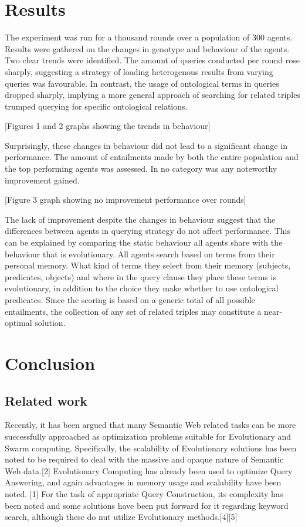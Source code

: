 \documentclass[thesis,12pt]{article}
\begin{document}
\section{Results}
The experiment was run for a thousand rounds over a population of 300 agents. Results were gathered on the changes in genotype and behaviour of the agents. Two clear trends were identified. The amount of queries conducted per round rose sharply, suggesting a strategy of loading heterogenous results from varying queries was favourable. In contrast, the usage of ontological terms in queries dropped sharply, implying a more general approach of searching for related triples trumped querying for specific ontological relations.

[Figures 1 and 2 graphs showing the trends in behaviour]

Surprisingly, these changes in behaviour did not lead to a significant change in performance. The amount of entailments made by both the entire population and the top performing agents was assessed. In no category was any noteworthy improvement gained.

[Figure 3 graph showing no improvement performance over rounds]


The lack of improvement despite the changes in behaviour suggest that the differences between agents in querying strategy do not affect performance. This can be explained by comparing the static behaviour all agents share with the behaviour that is evolutionary. All agents search based on terms from their personal memory. What kind of terms they select from their memory (subjects, predicates, objects) and where in the query clause they place these terms is evolutionary, in addition to the choice they make whether to use ontological predicates. Since the scoring is based on a generic total of all possible entailments, the collection of any set of related triples may constitute a near-optimal solution.



\section{Conclusion}


\subsection{Related work}
Recently, it has been argued that many Semantic Web related tasks can be more successfully approached as optimization problems suitable for Evolutionary and Swarm computing. Specifically, the scalability of Evolutionary solutions has been noted to be required to deal with the massive and opaque nature of Semantic Web data.[2] 
Evolutionary Computing has already been used to optimize Query Answering, and again advantages in memory usage and scalability have been noted. [1] For the task of appropriate Query Construction, its complexity has been noted and some solutions have been put forward for it regarding keyword search, although these do nut utilize Evolutionary methods.[4][5]
\end{document}
